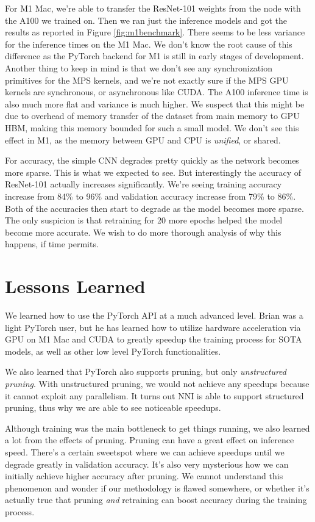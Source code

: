 \documentclass{article}
\begin{document}
For M1 Mac, we're able to transfer the ResNet-101 weights from the node with the A100 we trained on. Then we ran just the inference models and got the results as reported in Figure \ref{fig:m1benchmark}. There seems to be less variance for the inference times on the M1 Mac. We don't know the root cause of this difference as the PyTorch backend for M1 is still in early stages of development. Another thing to keep in mind is that we don't see any synchronization primitives for the MPS kernels, and we're not exactly sure if the MPS GPU kernels are synchronous, or asynchronous like CUDA. The A100 inference time is also much more flat and variance is much higher. We suspect that this might be due to overhead of memory transfer of the dataset from main memory to GPU HBM, making this memory bounded for such a small model. We don't see this effect in M1, as the memory between GPU and CPU is \textit{unified}, or shared.

For accuracy, the simple CNN degrades pretty quickly as the network becomes more sparse. This is what we expected to see. But interestingly the accuracy of ResNet-101 actually increases significantly. We're seeing training accuracy increase from 84\% to 96\% and validation accuracy increase from 79\% to 86\%. Both of the accuracies then start to degrade as the model becomes more sparse. The only suspicion is that retraining for 20 more epochs helped the model become more accurate. We wish to do more thorough analysis of why this happens, if time permits.

\section{Lessons Learned}
We learned how to use the PyTorch API at a much advanced level. Brian was a light PyTorch user, but he has learned how to utilize hardware acceleration via GPU on M1 Mac and CUDA to greatly speedup the training process for SOTA models, as well as other low level PyTorch functionalities.

We also learned that PyTorch also supports pruning, but only \textit{unstructured pruning}. With unstructured pruning, we would not achieve any speedups because it cannot exploit any parallelism. It turns out NNI is able to support structured pruning, thus why we are able to see noticeable speedups.

Although training was the main bottleneck to get things running, we also learned a lot from the effects of pruning. Pruning can have a great effect on inference speed. There's a certain sweetspot where we can achieve speedups until we degrade greatly in validation accuracy. It's also very mysterious how we can initially achieve higher accuracy after pruning. We cannot understand this phenomenon and wonder if our methodology is flawed somewhere, or whether it's actually true that pruning \textit{and} retraining can boost accuracy during the training process.
\end{document}
